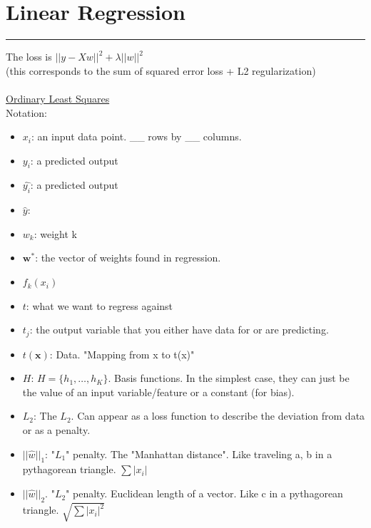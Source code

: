 \section{Linear Regression}
\smallskip \hrule height 2pt \smallskip

The loss is $|| y - Xw ||^2 + \lambda || w ||^2$ \hfill \\
(this corresponds to the sum of squared error loss + L2 regularization)\hfill \\
\hfill \\

\underline{Ordinary Least Squares} \hfill \\

Notation:
\begin{itemize}
	\item \textbf{$x_i$}: an input data point.  \_\_ rows by \_\_ columns. 
	\item \textbf{$y_i$}: a predicted output
	\item \textbf{$\widehat{y_i}$}: a predicted output
	\item \textbf{$\widehat{y}$}: 
	\item \textbf{$w_k$}: weight k
	\item \textbf{$\bm{w}^*$}: the vector of weights found in regression.   
	\item \textbf{$f_k(x_i)$}
	\item \textbf{$t$}: what we want to regress against
	\item \textbf{$t_j$}: the output variable that you either have data for or are predicting. 
	\item \textbf{$t(\bm{x})$}: Data.  "Mapping from x to t(x)"
	\item \textbf{$H$}: $H = \{ h_1, \dots, h_K \}$.  Basis functions.  In the simplest case, they can just be the value of an input variable/feature or a constant (for bias).  
	\item \textbf{$L_2$}: The $L_2$.  Can appear as a loss function to describe the deviation from data or as a penalty.  
	\item \textbf{$ || \widehat{w} ||_1$}: "$L_1$" penalty.  The "Manhattan distance".  Like traveling a, b in a pythagorean triangle.  $\sum |x_i|$
	\item \textbf{$ || \widehat{w} ||_2$}.  "$L_2$" penalty.  Euclidean length of a vector.  Like c in a pythagorean triangle.  $\sqrt{\sum |x_i|^2}$	
\end{itemize}

